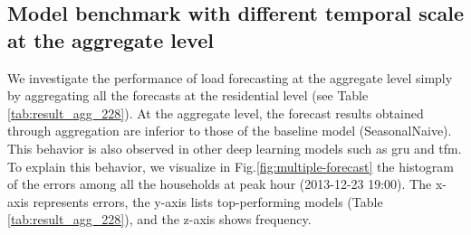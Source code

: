 \subsection{Model benchmark with different temporal scale at the aggregate level}
We investigate the performance of load forecasting at the aggregate level simply by aggregating all the forecasts at the residential level (see Table \ref{tab:result_agg_228}). At the aggregate level, the forecast results obtained through aggregation are inferior to those of the baseline model (SeasonalNaive). This behavior is also observed in other deep learning models such as \acrshort{gru} and \acrshort{tfm}. 
To explain this behavior, we visualize in Fig.\ref{fig:multiple-forecast} the histogram of the errors among all the households at peak hour (2013-12-23 19:00). The x-axis represents errors, the y-axis lists top-performing models (Table \ref{tab:result_agg_228}), and the z-axis shows frequency.



